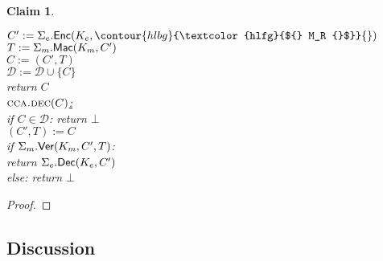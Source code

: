 \documentclass[11pt,letterpaper]{article}
\newcommand{\hl}[1]{%
    \relax\ifmmode%
        {}%
        \contour{hlbg}{\textcolor{hlfg}{${} #1 {}$}}%
        {}%
    \else%
        \contour{hlbg}{\textcolor{hlfg}{#1}}%
    \fi%
}
\newcommand{\procheader}[1]{\underline{#1}}
\newcommand{\ptxt}{M}
\newcommand{\ctxt}{C}
\newcommand{\key}{K}
\newcommand{\algorithm}[1]{\ensuremath{\textsf{\upshape#1}}\xspace}
\newcommand{\Enc}{\algorithm{Enc}}
\newcommand{\Dec}{\algorithm{Dec}}
\newcommand{\Mac}{\algorithm{Mac}}
\newcommand{\Ver}{\algorithm{Ver}}
\newcommand{\subname}[1]{\textsc{#1}}
\newcommand{\ccadec}{\subname{cca.dec}}
\newtheorem{claim}[theorem]{Claim}
\newcommand{\hybproof}[1]{}
\begin{document}
\begin{claim}
\begin{center}
\begin{varwidth}{\linewidth}
{    \> $\ctxt' := \Sigma_e.\Enc(\key_e, \hl{\ptxt_R})$\\
    \> $T := \Sigma_m.\Mac(\key_m, \ctxt')$\\
    \> $\ctxt := (\ctxt', T)$\\
    \> $\mathcal{D} := \mathcal{D} \cup \{ \ctxt \}$\\
    \> return $\ctxt$\\[8pt]
    \procheader{$\ccadec(\ctxt)$:}\\
    \> if $\ctxt \in \mathcal{D}$: return $\bot$\\
    \> $(\ctxt', T) := \ctxt$\\
    \> if $\Sigma_m.\Ver(\key_m,\ctxt',T)$:\\
    \> \> return $\Sigma_e.\Dec(\key_e,\ctxt')$\\
    \> else: return $\bot$
    }
\end{varwidth}    \end{center}
\end{claim}


\begin{proof}
\hybproof{enc-then-mac}
\end{proof}

\subsection{Discussion}
\end{document}
